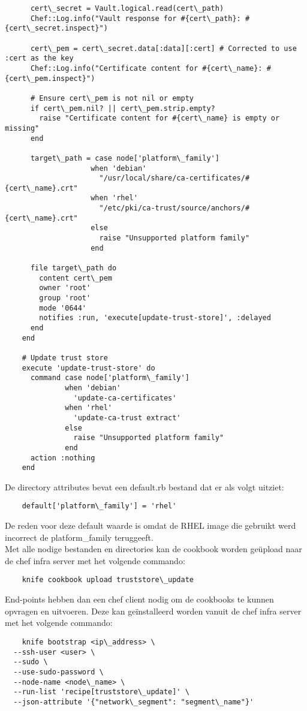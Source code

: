 \begin{verbatim}
      cert\_secret = Vault.logical.read(cert\_path)
      Chef::Log.info("Vault response for #{cert\_path}: #{cert\_secret.inspect}")
    
      cert\_pem = cert\_secret.data[:data][:cert] # Corrected to use :cert as the key
      Chef::Log.info("Certificate content for #{cert\_name}: #{cert\_pem.inspect}")
    
      # Ensure cert\_pem is not nil or empty
      if cert\_pem.nil? || cert\_pem.strip.empty?
        raise "Certificate content for #{cert\_name} is empty or missing"
      end
    
      target\_path = case node['platform\_family']
                    when 'debian'
                      "/usr/local/share/ca-certificates/#{cert\_name}.crt"
                    when 'rhel'
                      "/etc/pki/ca-trust/source/anchors/#{cert\_name}.crt"
                    else
                      raise "Unsupported platform family"
                    end
    
      file target\_path do
        content cert\_pem
        owner 'root'
        group 'root'
        mode '0644'
        notifies :run, 'execute[update-trust-store]', :delayed
      end
    end
    
    # Update trust store
    execute 'update-trust-store' do
      command case node['platform\_family']
              when 'debian'
                'update-ca-certificates'
              when 'rhel'
                'update-ca-trust extract'
              else
                raise "Unsupported platform family"
              end
      action :nothing
    end
\end{verbatim}

De directory attributes bevat een default.rb bestand dat er als volgt uitziet:
\begin{verbatim}
    default['platform\_family'] = 'rhel'
\end{verbatim}

De reden voor deze default waarde is omdat de RHEL image die gebruikt werd incorrect de platform\_family teruggeeft. \\

Met alle nodige bestanden en directories kan de cookbook worden geüpload naar de chef infra server met het volgende commando:
\begin{verbatim}
    knife cookbook upload truststore\_update
\end{verbatim}

End-points hebben dan een chef client nodig om de cookbooks te kunnen opvragen en uitvoeren. Deze kan geïnstalleerd worden vanuit de chef infra server met het volgende commando:
\begin{verbatim}
    knife bootstrap <ip\_address> \
  --ssh-user <user> \
  --sudo \
  --use-sudo-password \
  --node-name <node\_name> \
  --run-list 'recipe[truststore\_update]' \
  --json-attribute '{"network\_segment": "segment\_name"}'
\end{verbatim}

